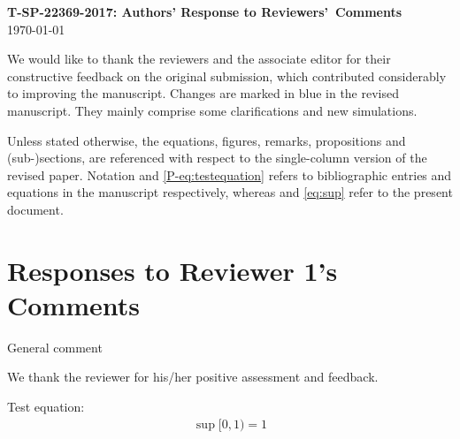 \documentclass[11pt]{article}
\begin{document}
\begin{center}
    \Large \textbf{T-SP-22369-2017: Authors' Response to Reviewers'~Comments}\\
    \today
\end{center}

We would like to thank the reviewers and the associate editor for
their constructive feedback on the original submission, which
contributed considerably to improving the manuscript. Changes are
marked in {\color{blue}blue} in the revised manuscript. They mainly
comprise some clarifications and new simulations.


\noindent Unless stated otherwise, the equations, figures, remarks,
propositions and (sub-)sections, are referenced with respect to the
single-column version of the revised paper. Notation \cite{P-kay1}
and \eqref{P-eq:testequation} refers to bibliographic entries and equations in
the manuscript respectively, whereas \cite{kay2} and \eqref{eq:sup}
refer to the present document.

\section*{Responses to Reviewer 1's Comments}
\begin{rcomment}
    General comment
\end{rcomment}

\vspace*{0.5em} \noindent
\begin{response}
    We thank the reviewer for his/her positive assessment and feedback.

    Test equation:
    \begin{align}
        \label{eq:sup}
        \sup[0,1) = 1
    \end{align}

\end{response}
\end{document}
